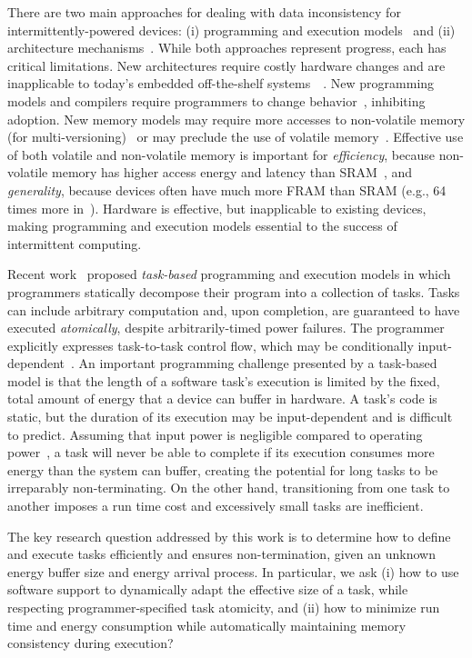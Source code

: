 There are two main approaches for dealing with data inconsistency for intermittently-powered devices: (i) programming and execution models~\cite{dino,ratchet,chain,alpaca} and (ii) architecture
mechanisms~\cite{hicks_isca_2017,idetic,nvp,tictpl}. While both approaches represent progress, each has critical limitations. New architectures require costly hardware changes and are inapplicable to today's embedded off-the-shelf systems~\cite[Fig. 3]{hicks_isca_2017}~\cite[Fig. 9]{nvp}. New programming models and compilers require programmers to change behavior~\cite{chain,ratchet}, inhibiting adoption.  New memory models may require more accesses to non-volatile memory (for multi-versioning)~\cite{dino,chain} or may preclude the use of volatile memory~\cite{ratchet}. Effective use of both volatile and non-volatile memory is important for \emph{efficiency}, because non-volatile memory has higher access energy and latency than SRAM~\cite[Fig. 4]{nvp}, and \emph{generality}, because devices often have much more FRAM than SRAM (e.g., 64 times more in~\cite{wolverine}). Hardware is effective, but inapplicable to existing devices, making programming and execution models essential to the success of intermittent computing.

Recent work~\cite{alpaca,chain} proposed {\em task-based} programming and execution models in which programmers statically decompose their program into a collection of tasks. Tasks can include arbitrary computation and, upon completion, are guaranteed to have executed {\em atomically}, despite arbitrarily-timed power failures. The programmer explicitly expresses task-to-task control flow, which may be conditionally input-dependent~\cite[Fig. 4]{chain}. An important programming challenge presented by a task-based model is that the length of a software task's execution is limited by the fixed, total amount of energy that a device can buffer in hardware.  A task's code is static, but the duration of its execution may be input-dependent and is difficult to predict. Assuming that input power is negligible compared to operating power~\cite{wisp}, a task will never be able to complete if its execution consumes more energy than the system can buffer, creating the potential for long tasks to be irreparably non-terminating. On the other hand, transitioning from one task to another imposes a run time cost and excessively small tasks are inefficient. 

The key research question addressed by this work is to determine how to define and execute tasks efficiently and ensures non-termination, given an unknown energy buffer size and energy arrival process. In particular, we ask (i) how to use software support to dynamically adapt the effective size of a task, while respecting programmer-specified task atomicity, and (ii) how to minimize run time and energy consumption while automatically maintaining memory consistency during execution?

